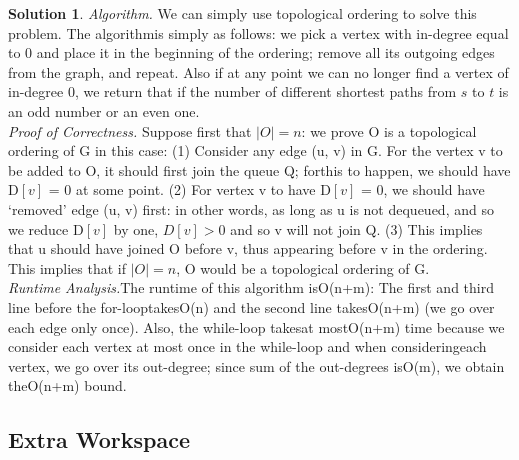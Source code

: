 \documentclass{article}
\theoremstyle{definition}
\newtheorem*{solution*}{Solution}
\newenvironment{solution}{\begin{solution*}}{{} \end{solution*}}
\begin{document}
\begin{solution}
	
	\emph{Algorithm.} We can simply use topological ordering to solve this problem. The algorithmis simply as follows: we pick a vertex with in-degree equal to 0 and place it in the beginning of the ordering; remove all its outgoing edges from the graph, and repeat. Also if at any point we can no longer find a vertex of in-degree 0, we return that if the number of different shortest paths from $s$ to $t$ is an odd number or an even one. \\

	\emph{Proof of Correctness.} Suppose first that $|O|=n$: we prove O is a topological ordering of G in this case: (1) Consider any edge (u, v) in G. For the vertex v to be added to O, it should first join the queue Q; forthis to happen, we should have D$[v]$ = 0 at some point. (2) For vertex v to have D$[v]$ = 0, we should have ‘removed’ edge (u, v) first: in other words, as long as u is not dequeued, and so we reduce D$[v]$ by one, $D[v]>0$ and so v will not join Q. (3) This implies that u should have joined O before v, thus appearing before v in the ordering. This implies that if $|O|=n$, O would be a topological ordering of G. \\
 
	\emph{Runtime Analysis.}The runtime of this algorithm isO(n+m):  The first and third line before the for-looptakesO(n) and the second line takesO(n+m) (we go over each edge only once).  Also, the while-loop takesat mostO(n+m) time because we consider each vertex at most once in the while-loop and when consideringeach vertex, we go over its out-degree; since sum of the out-degrees isO(m), we obtain theO(n+m) bound. \\


\end{solution}

\newpage
\subsection*{Extra Workspace}
\end{document}
